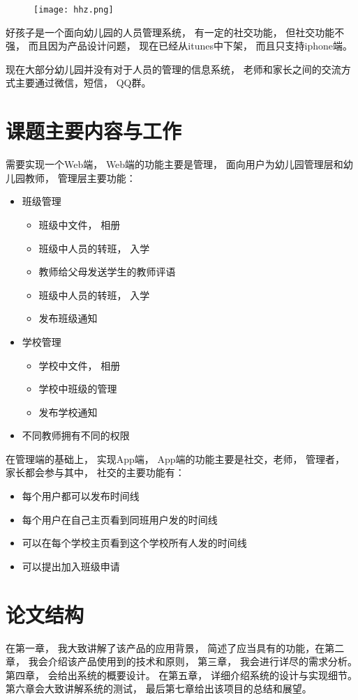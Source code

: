 \begin{figure}[H]
	\centering
	\texttt{[image: hhz.png]}
	\label{fig:haohaizi}
\end{figure}

好孩子是一个面向幼儿园的人员管理系统， 有一定的社交功能， 但社交功能不强， 而且因为产品设计问题， 现在已经从itunes中下架， 而且只支持iphone端。



现在大部分幼儿园并没有对于人员的管理的信息系统， 老师和家长之间的交流方式主要通过微信，短信， QQ群。  


\section{课题主要内容与工作}

需要实现一个Web端， Web端的功能主要是管理， 面向用户为幼儿园管理层和幼儿园教师， 管理层主要功能：
	
	\begin{itemize}
		\item 	班级管理
		\begin{itemize}
			\item 班级中文件， 相册
			\item 班级中人员的转班， 入学
			\item 教师给父母发送学生的教师评语
			\item 班级中人员的转班， 入学
			\item 发布班级通知
		\end{itemize}
		
			\item 学校管理
		\begin{itemize}
			\item 学校中文件， 相册
			\item 学校中班级的管理
			\item 发布学校通知
		\end{itemize}
		 
		\item 不同教师拥有不同的权限
	
	\end{itemize}


在管理端的基础上， 实现App端， App端的功能主要是社交，老师， 管理者， 家长都会参与其中， 社交的主要功能有：

\begin{itemize}
	\item 每个用户都可以发布时间线
	\item 每个用户在自己主页看到同班用户发的时间线
	\item 可以在每个学校主页看到这个学校所有人发的时间线
	\item 可以提出加入班级申请
\end{itemize}


\section{论文结构}

在第一章， 我大致讲解了该产品的应用背景， 简述了应当具有的功能，在第二章， 我会介绍该产品使用到的技术和原则， 第三章， 我会进行详尽的需求分析。第四章， 会给出系统的概要设计。 在第五章， 详细介绍系统的设计与实现细节。第六章会大致讲解系统的测试， 最后第七章给出该项目的总结和展望。

